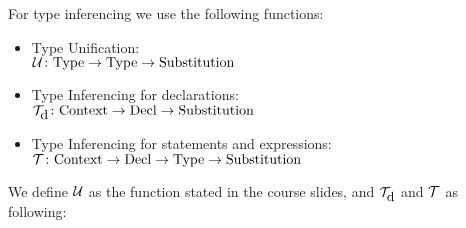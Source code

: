 \documentclass[14pt]{amsart}
\begin{document}
For type inferencing we use the following functions:

\begin{itemize}
	\item Type Unification: \\
		$\mathcal{U} \colon \mbox{Type} \rightarrow \mbox{Type} \rightarrow \mbox{Substitution}$
	\item Type Inferencing for declarations: \\
		$\mathcal{T}_{\mbox{d}} \colon \mbox{Context} \rightarrow \mbox{Decl} \rightarrow \mbox{Substitution}$
	\item Type Inferencing for statements and expressions: \\
		$\mathcal{T} \colon \mbox{Context} \rightarrow \mbox{Decl} \rightarrow \mbox{Type} \rightarrow \mbox{Substitution}$
\end{itemize}

We define $\mathcal{U}$ as the function stated in the course slides, and $\mathcal{T}_{\mbox{d}}$ and $\mathcal{T}$ as following:
\end{document}
